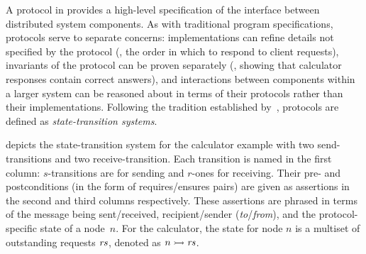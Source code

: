 A protocol in \disel provides a high-level specification of the interface
between distributed system components.
%
As with traditional program specifications, \disel protocols serve to
separate concerns: implementations can refine details not specified by
the protocol (\eg, the order in which to respond to client requests),
invariants of the protocol can be proven separately (\eg, showing that
calculator responses contain correct answers), and interactions
between components within a larger system can be reasoned about in
terms of their protocols rather than their implementations.
%
Following the tradition established by~\citet{Lamport:CN78}, \disel
protocols are defined as \emph{state-transition systems}.

 depicts the state-transition system for the
calculator example with two send-transitions and two
receive-transition.
%
Each transition is named in the first column: $s$-transitions are for
sending and $r$-ones for receiving. Their pre- and postconditions
(in the form of requires/ensures pairs) are given as assertions in the
second and third columns respectively.
%
These assertions are phrased in terms of the message being
sent/received, recipient/sender (\emph{to}/\emph{from}), and the
protocol-specific state of a node~$n$.
%
For the calculator, the state for node $n$ is a multiset of
outstanding requests $\mathit{rs}$, denoted as $n \ppts{} \Rs$.


